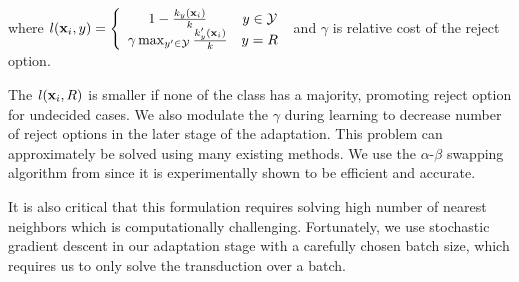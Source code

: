 where $l(\mathbf{x}_i, y) = \left\{ \begin{array}{cc}  1 - \frac{k_y(\mathbf{x}_i)}{k} & y \in \mathcal{Y} \\ \gamma \max_{y^\prime \in \mathcal{Y}} \frac{k_y^\prime(\mathbf{x}_i)}{k}
 & y=R \end{array}\right.$ and $\gamma$ is relative cost of the reject option. 
 
The $l(\mathbf{x}_i,R)$ is smaller if none of the class has a majority, promoting reject option for undecided cases. We also modulate the $\gamma$ during learning to decrease number of reject options in the later stage of the adaptation. This problem can approximately be solved using many existing methods. We use the $\alpha$-$\beta$ swapping algorithm from \cite{kolmogrovalphabeta} since it is experimentally shown to be efficient and accurate. %

It is also critical that this formulation requires solving high number of nearest neighbors which is computationally challenging. Fortunately, we use stochastic gradient descent in our adaptation stage with a carefully chosen batch size, which requires us to only solve the transduction over a batch. %

